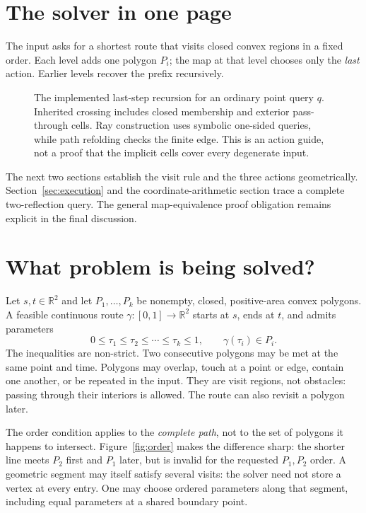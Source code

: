 \documentclass[12pt,a4paper]{article}
\newcommand{\R}{\mathbb R}
\begin{document}
\section*{The solver in one page}
{}
The input asks for a shortest route that visits closed convex regions in a fixed order. Each level adds one polygon \(P_i\); the map at that level chooses only the \emph{last} action. Earlier levels recover the prefix recursively.

\begin{figure}[H]\centering\figoverview
\caption{The implemented last-step recursion for an ordinary point query \(q\). Inherited crossing includes closed membership and exterior pass-through cells. Ray construction uses symbolic one-sided queries, while path refolding checks the finite edge. This is an action guide, not a proof that the implicit cells cover every degenerate input.}\label{fig:overview}
\end{figure}

The next two sections establish the visit rule and the three actions geometrically. Section~\ref{sec:execution} and the coordinate-arithmetic section trace a complete two-reflection query. The general map-equivalence proof obligation remains explicit in the final discussion.
\clearpage

\section{What problem is being solved?}
Let \(s,t\in\R^2\) and let \(P_1,\ldots,P_k\) be nonempty, closed, positive-area convex polygons. A feasible continuous route \(\gamma:[0,1]\to\R^2\) starts at \(s\), ends at \(t\), and admits parameters
\[
0\le\tau_1\le\tau_2\le\cdots\le\tau_k\le1,
\qquad \gamma(\tau_i)\in P_i.
\]
The inequalities are non-strict. Two consecutive polygons may be met at the same point and time. Polygons may overlap, touch at a point or edge, contain one another, or be repeated in the input. They are visit regions, not obstacles: passing through their interiors is allowed. The route can also revisit a polygon later.

The order condition applies to the \emph{complete path}, not to the set of polygons it happens to intersect. Figure~\ref{fig:order} makes the difference sharp: the shorter line meets \(P_2\) first and \(P_1\) later, but is invalid for the requested \(P_1,P_2\) order. A geometric segment may itself satisfy several visits: the solver need not store a vertex at every entry. One may choose ordered parameters along that segment, including equal parameters at a shared boundary point.
\end{document}
